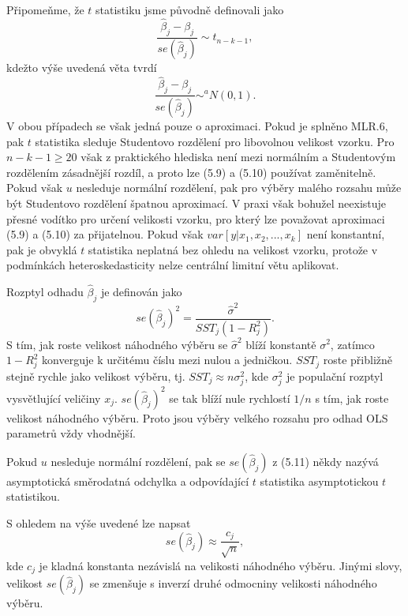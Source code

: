Připomeňme, že $t$ statistiku jsme původně definovali jako
\begin{equation}
\frac{\hat{\beta}_j - \beta_j}{se(\hat{\beta}_j)} \sim t_{n - k - 1},
\end{equation}
kdežto výše uvedená věta tvrdí
\begin{equation}
\frac{\hat{\beta}_j - \beta_j}{se(\hat{\beta}_j)} \sim^a N(0, 1).
\end{equation}
V obou případech se však jedná pouze o aproximaci. Pokud je splněno MLR.6, pak $t$ statistika sleduje Studentovo rozdělení pro libovolnou velikost vzorku. Pro $n - k - 
1 \ge 20$ však z praktického hlediska není mezi normálním a Studentovým rozdělením zásadnější rozdíl, a proto lze (5.9) a (5.10) 
používat zaměnitelně. Pokud však $u$ nesleduje normální rozdělení, pak pro výběry malého rozsahu může být Studentovo rozdělení špatnou 
aproximací. V praxi však bohužel neexistuje přesné vodítko pro určení velikosti vzorku, pro který lze považovat aproximaci (5.9) a (5.10) 
za přijatelnou. Pokud však $var[y| x_1, x_2, ..., x_k]$ není konstantní, pak je obvyklá $t$ statistika neplatná bez ohledu na velikost vzorku, 
protože v podmínkách heteroskedasticity nelze centrální limitní větu aplikovat.

Rozptyl odhadu $\hat{\beta}_j$ je definován jako
\begin{equation}
se(\hat{\beta}_j)^2 = \frac{\hat{\sigma}^2}{SST_j(1 - R_j^2)}.
\end{equation}
S tím, jak roste velikost náhodného výběru se $\hat{\sigma}^2$ blíží konstantě $\sigma^2$, zatímco $1 - R_j^2$ konverguje k určitému 
číslu mezi nulou a jedničkou. $SST_j$ roste přibližně stejně rychle jako 
velikost výběru, tj. $SST_j \approx n \sigma_j^2$, kde $\sigma_j^2$ je populační rozptyl vysvětlující veličiny $x_j$. 
$se(\hat{\beta}_j)^2$ se tak blíží nule rychlostí $1/n$ s tím, jak roste velikost náhodného výběru. Proto jsou výběry velkého rozsahu pro odhad OLS 
parametrů vždy vhodnější.

Pokud $u$ nesleduje normální rozdělení, pak se $se(\hat{\beta}_j)$ z (5.11) někdy nazývá asymptotická směrodatná odchylka a odpovídající 
$t$ statistika asymptotickou $t$ statistikou.

S ohledem na výše uvedené lze napsat
\begin{equation}
se(\hat{\beta}_j) \approx \frac{c_j}{\sqrt{n}},
\end{equation}
kde $c_j$ je kladná konstanta nezávislá na velikosti náhodného výběru. Jinými slovy, velikost $se(\hat{\beta}_j)$ se zmenšuje s inverzí druhé 
odmocniny velikosti náhodného výběru.

